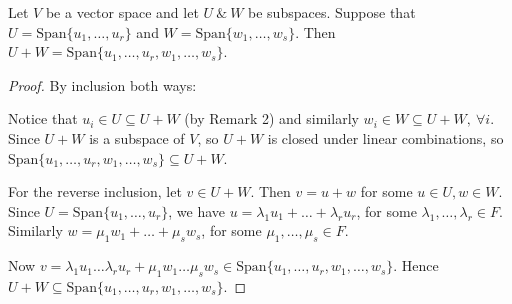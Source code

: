 \documentclass[10pt]{scrartcl}
\begin{document}
\begin{proposition}Let {\normalfont{}}
 $V$ be a vector space and let $U ~\&~ W$ be subspaces. Suppose that $U = \text{Span}\{u_1,\dots,u_r\}$ and $W = \text{Span}\{w_1,\dots,w_s\}$. Then $U + W = \text{Span}\{u_1,\dots,u_r,w_1,\dots,w_s\}$. 
\end{proposition}
\begin{proof}
By inclusion both ways:

Notice that $u_i \in U \subseteq U + W$ (by Remark 2) and similarly $w_i \in W \subseteq U + W, ~\forall i$. Since $U + W$ is a subspace of $V$, so $U + W$ is closed under linear combinations, so $\text{Span}\{u_1,\dots,u_r,w_1,\dots,w_s\} \subseteq U + W.$

For the reverse inclusion, let $v \in U + W$. Then $v = u + w$ for some $u \in U, w \in W$. Since $U = \text{Span}\{u_1,\dots,u_r\}$, we have $u = \lambda_1u_1 + \dots + \lambda_ru_r$, for some $\lambda_1,\dots,\lambda_r \in F$. Similarly $w = \mu_1w_1 + \dots + \mu_sw_s$, for some $\mu_1,\dots,\mu_s \in F$.

Now $v = \lambda_1u_1 \dots \lambda_ru_r + \mu_1w_1 \dots \mu_sw_s \in \text{Span}\{u_1,\dots,u_r,w_1,\dots,w_s\}$. Hence $U + W \subseteq \text{Span}\{u_1,\dots,u_r,w_1,\dots,w_s\}$.
\end{proof}\vspace*{5pt}
\end{document}
